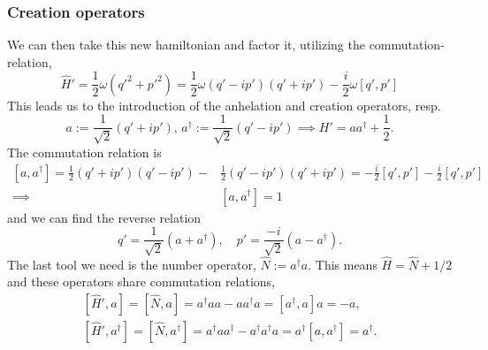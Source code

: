 \subsubsection*{Creation operators}
We can then take this new hamiltonian and factor it, utilizing the commutation-relation,
\begin{equation*}
    \hat H' = \frac{1}{2} \omega (q'^2 + p'^2) = \frac{1}{2} \omega (q' - ip')(q' + ip') - \frac{i}{2} \omega [q', p']
\end{equation*}
This leads us to the introduction of the anhelation and creation operators, resp.
\begin{equation}
    \label{creation operators}
    a := \frac{1}{\sqrt{2}}(q' + ip'), \, a^\dagger := \frac{1}{\sqrt{2}}(q' - ip') \implies H' = aa^\dagger + \frac{1}{2}.
\end{equation}
The commutation relation is
\begin{align}
    \nonumber[a, a^\dagger] = \frac{1}{2}(q' + ip')(q' - ip') - &\frac{1}{2}(q' - ip')(q' + ip') = -\frac{i}{2}[q', p'] -\frac{i}{2}[q', p'] \\
    \implies &[a, a^\dagger] = 1
    \label{commutation relation creation operators}
\end{align}
and we can find the reverse relation
\begin{equation*}
    q' = \frac{1}{\sqrt{2}}(a + a^\dagger), \quad p' = \frac{-i}{\sqrt{2}}(a - a^\dagger).
\end{equation*}
The last tool we need is the number operator, $\hat N := a^\dagger a $. This means $\hat H = \hat N + 1/2$ and these operators share commutation relations,
\begin{align}
    \label{commutation relation Hamiltonian and creation operator}
    [\hat H', a] = [\hat N, a] = a^\dagger a a - a a^\dagger a = [a^\dagger, a]a = -a, \\ \nonumber
    [\hat H', a^\dagger] = [\hat N, a^\dagger] = a^\dagger a a^\dagger - a^\dagger a^\dagger a = a^\dagger[a, a^\dagger] = a^\dagger.
\end{align}

